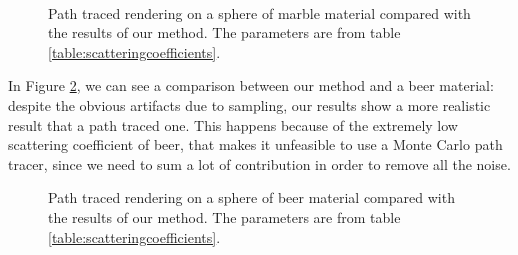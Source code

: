 \begin{figure}
{}
\\
\caption{Path traced rendering on a sphere of marble material compared with the results of our method. The parameters are from table \ref{table:scatteringcoefficients}.}
\label{fig:pathmarble}
\end{figure}

\FloatBarrier
In Figure \ref{fig:pathbeer}, we can see a comparison between our method and a beer material: despite the obvious artifacts due to sampling, our results show a more realistic result that a path traced one. This happens because of the extremely low scattering coefficient of beer, that makes it unfeasible to use a Monte Carlo path tracer, since we need to sum a lot of contribution in order to remove all the noise. 

\begin{figure}[!ht]
\centering
{}
\caption{Path traced rendering on a sphere of beer material compared with the results of our method. The parameters are from table \ref{table:scatteringcoefficients}.}
\label{fig:pathbeer}
\end{figure}

